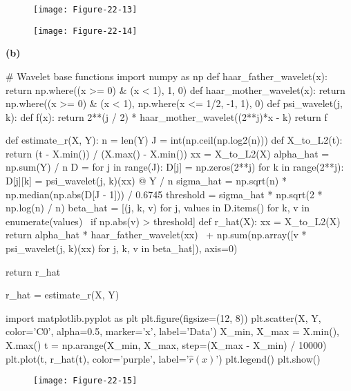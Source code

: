 \begin{figure}[H]
\centering
\texttt{[image: Figure-22-13]}
\end{figure}

\begin{figure}[H]
\centering
\texttt{[image: Figure-22-14]}
\end{figure}

\textbf{(b)}

\begin{python}
# Wavelet base functions
import numpy as np
def haar_father_wavelet(x):
    return np.where((x >= 0) & (x < 1), 1, 0)
def haar_mother_wavelet(x):
    return np.where((x >= 0) & (x < 1),  np.where(x <= 1/2, -1, 1), 0)
def psi_wavelet(j, k):
    def f(x):
        return 2**(j / 2) * haar_mother_wavelet((2**j)*x - k)
    return f
\end{python}

\begin{python}
def estimate_r(X, Y):
    n = len(Y)
    J = int(np.ceil(np.log2(n)))
    def X_to_L2(t):
        return (t - X.min()) / (X.max() - X.min())
    xx = X_to_L2(X)
    alpha_hat = np.sum(Y) / n
    D = {}
    for j in range(J):
        D[j] = np.zeros(2**j)
        for k in range(2**j):
            D[j][k] = psi_wavelet(j, k)(xx) @ Y / n
    sigma_hat = np.sqrt(n) * np.median(np.abs(D[J - 1])) / 0.6745
    threshold = sigma_hat * np.sqrt(2 * np.log(n) / n)
    beta_hat = [(j, k, v) for j, values in D.items() for k, v in enumerate(values) \ 
        if np.abs(v) > threshold]
    def r_hat(X):
        xx = X_to_L2(X)
        return alpha_hat * haar_father_wavelet(xx) \
            + np.sum(np.array([v * psi_wavelet(j, k)(xx) for j, k, v in beta_hat]), axis=0)
    
    return r_hat
\end{python}

\begin{python}
r_hat = estimate_r(X, Y)
\end{python}

\begin{python}
import matplotlib.pyplot as plt
plt.figure(figsize=(12, 8))
plt.scatter(X, Y, color='C0', alpha=0.5, marker='x', label='Data')
X_min, X_max = X.min(), X.max()
t = np.arange(X_min, X_max, step=(X_max - X_min) / 10000)
plt.plot(t, r_hat(t), color='purple', label='$\hat{r}(x)$')
plt.legend()
plt.show()
\end{python}

\begin{figure}[H]
\centering
\texttt{[image: Figure-22-15]}
\end{figure}


